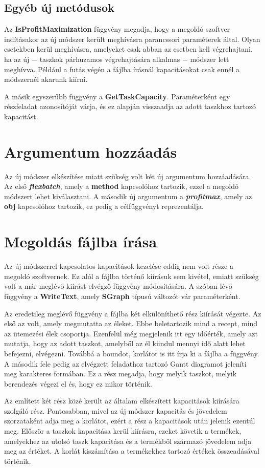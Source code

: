 \subsection{Egyéb új metódusok}
Az \textbf{IsProfitMaximization} függvény megadja, hogy a megoldó szoftver indításakor az új módszer került meghívásra parancssori paraméterek által. Olyan esetekben kerül meghívásra, amelyeket csak abban az esetben kell végrehajtani, ha az új $-$ taszkok párhuzamos végrehajtására alkalmas $-$ módszer lett meghívva. Például a futás végén a fájlba írásnál kapacitásokat csak ennél a módszernél akarunk kiírni.

A másik egyszerűbb függvény a \textbf{GetTaskCapacity}. Paraméterként egy részfeladat azonosítóját várja, és ez alapján visszaadja az adott taszkhoz tartozó kapacitást.

\section{Argumentum hozzáadás}
Az új módszer elkészítése miatt szükség volt két új argumentum hozzáadására.
Az első \textbf{\textit{flexbatch}}, amely a \textbf{method} kapcsolóhoz tartozik, ezzel a megoldó módszert lehet kiválasztani.
A második új argumentum a \textbf{\textit{profit\textunderscore max}}, amely az \textbf{obj} kapcsolóhoz tartozik, ez pedig a célfüggvényt reprezentálja.

\section{Megoldás fájlba írása}
Az új módszerrel kapcsolatos kapacitások kezelése eddig nem volt része a megoldó szoftvernek.
Ez alól a fájlba történő kiírásuk sem kivétel, emiatt szükség volt a már meglévő kiírást elvégző függvény módosítására.
A szóban lévő függvény a \textbf{WriteText}, amely \textbf{SGraph} típusú változót vár paraméterként.

Az eredetileg meglévő függvény a fájlba két elkülöníthető rész kiírását végezte. Az első az volt, amely megmutatta az éleket.
Ebbe beletartozik mind a recept, mind az ütemezési élek csoportja.
Ezenfelül még megjelenik itt egy időérték, amely azt mutatja, hogy az adott taszkot, amelyből az él kiindul mennyi idő alatt lehet befejezni, elvégezni. Továbbá a boundot, korlátot is itt írja ki a fájlba a függvény.
A második fele pedig az elvégzett feladathoz tartozó Gantt diagramot jeleníti meg karakteres formában.
Ez a rész megadja, hogy melyik taszkot, melyik berendezés végezi el és, hogy ez mikor történik.

Az említett két rész közé került az általam elkészített kapacitások kiírására szolgáló rész.
Pontosabban, mivel az új módszer kapacitás és jövedelem szorzataként adja meg a korlátot, ezért a rész a kapacitások után jelenik ezentúl meg.
Először a taszkok kapacitása kerül kiírásra, ezeket követik a termékek, amelyekhez az utolsó taszk kapacitása és a termékből származó jövedelem adja meg az értéket.
A korlát kiszámítása a termékekhez tartozó értékek összeadásával történik.